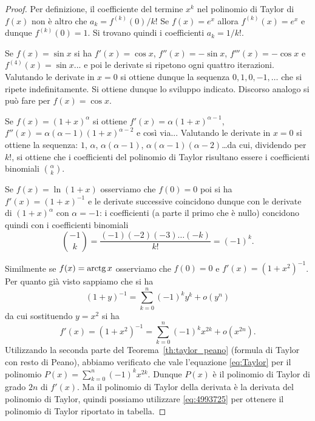 \begin{proof}
\mymark{**}
Per definizione, il coefficiente del termine $x^k$
nel polinomio di Taylor di $f(x)$ non è altro che $a_k=f^{(k)}(0)/k!$
Se $f(x) = e^x$ allora $f^{(k)}(x) = e^x$ e dunque $f^{(k)}(0) = 1$. Si trovano quindi i coefficienti $a_k = 1/k!$.

Se $f(x) = \sin x$ si ha $f'(x)=\cos x$, $f''(x) =-\sin x$, $f'''(x) = -\cos x$ e $f^{(4)}(x) = \sin x$... e poi le derivate si ripetono ogni quattro iterazioni. Valutando le derivate in $x=0$ si ottiene dunque la sequenza $0, 1, 0, -1, \dots$ che si ripete indefinitamente. Si ottiene dunque lo sviluppo indicato. Discorso analogo si può fare per $f(x) = \cos x$.

Se $f(x) = (1+x)^\alpha$ si ottiene $f'(x) = \alpha (1+x)^{\alpha -1}$, $f''(x) = \alpha (\alpha -1) (1+x)^{\alpha -2}$ e così via...
Valutando le derivate in $x=0$ si ottiene la sequenza: $1$, $\alpha$, $\alpha(\alpha-1)$, $\alpha (\alpha-1)(\alpha -2)$\dots da cui, dividendo per $k!$, si ottiene che i coefficienti del polinomio di Taylor risultano essere i coefficienti binomiali ${\alpha \choose k}$.

Se $f(x) = \ln (1+x)$ osserviamo che $f(0)=0$ poi si ha $f'(x) = (1+x)^{-1}$ e le derivate successive coincidono dunque con le derivate di $(1+x)^\alpha$ con $\alpha=-1$: i coefficienti (a parte il primo che è nullo) concidono quindi con i coefficienti binomiali
\[
{-1 \choose k} = \frac{(-1)(-2)(-3) \dots (-k)}{k!} = (-1)^k.
\]

Similmente se $f(x) = \operatorname{arctg} x$ osserviamo che $f(0) = 0$ e $f'(x) = (1+x^2)^{-1}$. Per quanto già visto sappiamo che si ha
\[
 (1+y)^{-1} = \sum_{k=0}^n (-1)^k y^k + o(y^n)
\]
da cui sostituendo $y=x^2$ si ha
\[
 f'(x) = (1+x^2)^{-1} = \sum_{k=0}^n (-1)^k x^{2k} + o(x^{2n}).
\]
Utilizzando la seconda parte del Teorema~\ref{th:taylor_peano} (formula di Taylor con resto di Peano),
abbiamo verificato che vale l'equazione \eqref{eq:Taylor}
per il polinomio $P(x) = \sum_{k=0}^n (-1)^k x^{2k}$.
Dunque $P(x)$ è il polinomio di Taylor di grado $2n$ di $f'(x)$.
Ma il polinomio di Taylor della derivata è la derivata del polinomio
di Taylor, quindi possiamo utilizzare \eqref{eq:4993725} per ottenere
il polinomio di Taylor riportato in tabella.


\end{proof}
